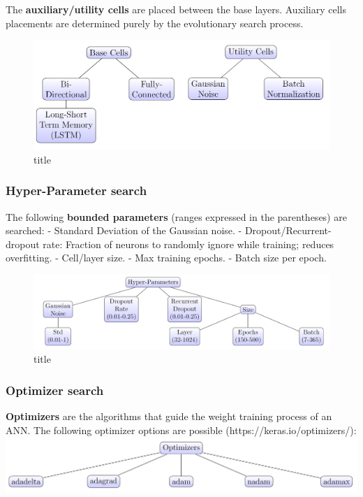 \documentclass[11pt]{article}
\makeatletter
\def\maxwidth{\ifdim\Gin@nat@width>\linewidth\linewidth
    \else\Gin@nat@width\fi}
\let\Oldincludegraphics\includegraphics
\renewcommand{\includegraphics}[1]{\Oldincludegraphics[width=.8\maxwidth]{#1}}
\makeatother
\begin{document}
The \textbf{auxiliary/utility cells} are placed between the base layers.
Auxiliary cells placements are determined purely by the evolutionary
search process.

\begin{figure}
\centering
\includegraphics{pics/cells.png}
\caption{title}
\end{figure}

    \hypertarget{hyper-parameter-search}{%
\subsubsection{Hyper-Parameter search}\label{hyper-parameter-search}}

The following \textbf{bounded parameters} (ranges expressed in the
parentheses) are searched: - Standard Deviation of the Gaussian noise. -
Dropout/Recurrent-dropout rate: Fraction of neurons to randomly ignore
while training; reduces overfitting. - Cell/layer size. - Max training
epochs. - Batch size per epoch.

    \begin{figure}
\centering
\includegraphics{pics/hyperParameters.png}
\caption{title}
\end{figure}

    \hypertarget{optimizer-search}{%
\subsubsection{Optimizer search}\label{optimizer-search}}

    \textbf{Optimizers} are the algorithms that guide the weight training
process of an ANN. The following optimizer options are possible
(https://keras.io/optimizers/): \includegraphics{pics/optimizers.png}
\end{document}
